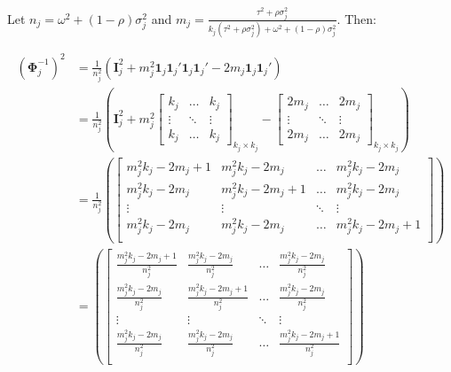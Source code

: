 Let $n_j = \omega^2 + (1-\rho) \sigma^2_j$ and $m_j = \frac{\tau^2 +\rho\sigma_j^2}{k_j(\tau^2 + \rho\sigma^2_j)+\omega^2+(1-\rho)\sigma_j^2}$. Then:

\begin{equation}
    \begin{split}
         (\mathbf{\Phi}_j^{-1})^2 & = \frac{1}{n_j^2} \left( \mathbf{I}^2_j + m^2_j \mathbf{1}_j \mathbf{1}_j' \mathbf{1}_j \mathbf{1}_j'  - 2m_j\mathbf{1}_j \mathbf{1}_j'  \right) \\
         & = \frac{1}{n_j^2} \left( \mathbf{I}^2_j + m^2_j \begin{bmatrix}
             k_j & \dots & k_j \\
             \vdots & \ddots  & \vdots  \\
             k_j &  \dots  &   k_j
         \end{bmatrix}_{k_j \times k_j}  - \begin{bmatrix}
             2m_j & \dots & 2m_j \\
             \vdots & \ddots  & \vdots  \\
             2m_j &  \dots  &   2m_j
         \end{bmatrix}_{k_j \times k_j}  \right) \\
         & = \frac{1}{n_j^2} \left( \begin{bmatrix}
             m_j^2 k_j - 2m_j + 1 & m_j^2 k_j - 2m_j & \dots & m_j^2 k_j - 2m_j \\
             m_j^2 k_j - 2m_j  & m_j^2 k_j - 2m_j +1 & \dots & m_j^2 k_j - 2m_j  \\
             \vdots  & \vdots & \ddots &  \vdots \\
             m_j^2 k_j - 2m_j  & m_j^2 k_j - 2m_j  & \dots&  m_j^2 k_j - 2m_j +1 \\
         \end{bmatrix}  \right) \\ 
         & = \left( \begin{bmatrix}
             \frac{m_j^2 k_j - 2m_j + 1}{n_j^2} & \frac{m_j^2 k_j - 2m_j}{n_j^2}& \dots & \frac{m_j^2 k_j - 2m_j}{n_j^2} \\
             \frac{m_j^2 k_j - 2m_j}{n_j^2} & \frac{m_j^2 k_j - 2m_j + 1}{n_j^2} & \dots & \frac{m_j^2 k_j - 2m_j}{n_j^2}  \\
             \vdots  & \vdots & \ddots &  \vdots \\
             \frac{m_j^2 k_j - 2m_j}{n_j^2} & \frac{m_j^2 k_j - 2m_j}{n_j^2} & \dots& \frac{m_j^2 k_j - 2m_j + 1}{n_j^2}\\
         \end{bmatrix}  \right) 
    \end{split}
    \nonumber
\end{equation}

